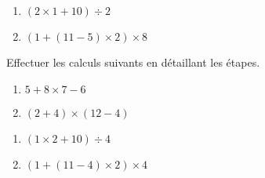 \documentclass{/home/nyaucki/Documents/Prof/CoursMaths/mycls/DevoirMaison}
\begin{document}
\begin{multicols}{2}
	\begin{enumerate}[start=3,label=\alph*.]
		\item $(2 \times 1 +10 ) \div 2$  \vspace*{8em}
		\item $(1 + (11 -5)\times 2)\times 8$ \vspace*{8em}
	\end{enumerate}
\end{multicols}



\newpage





\renewcommand{\nom}{ZEKA Eliot} 

\renewcommand{\prenom}{Eliot}



Effectuer les calculs suivants en détaillant les étapes.

\begin{multicols}{2}
	\begin{enumerate}[label=\alph*.]
		\item $5 + 8 \times 7 - 6$  \vspace*{7em}
		\item $(2 +4)\times (12 -4)$ \vspace*{7em}
	\end{enumerate}
\end{multicols}

\begin{multicols}{2}
	\begin{enumerate}[start=3,label=\alph*.]
		\item $(1 \times 2 +10 ) \div 4$  \vspace*{8em}
		\item $(1 + (11 -4)\times 2)\times 4$ \vspace*{8em}
	\end{enumerate}
\end{multicols}



\vfill
\end{document}
